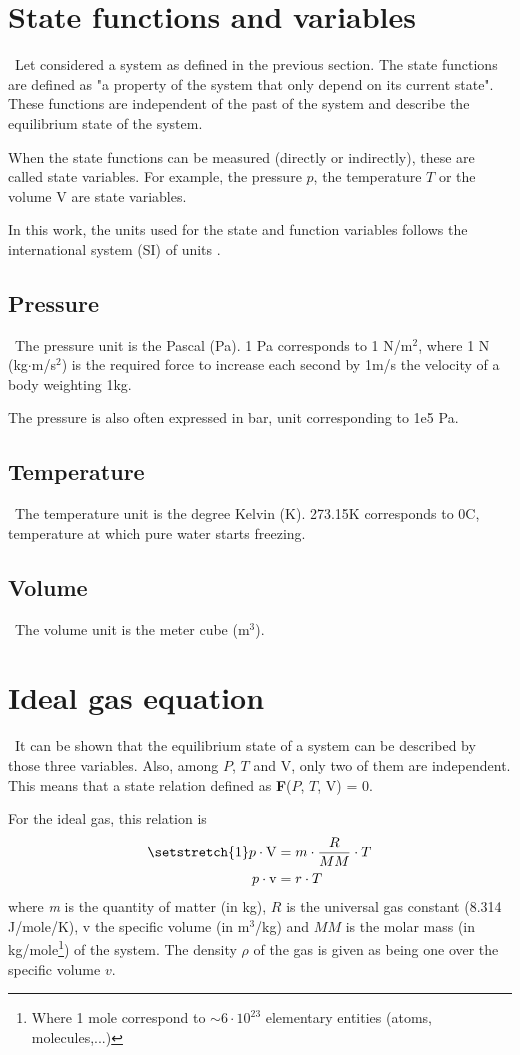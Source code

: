 \section{State functions and variables}\label{sect:C2_State}
\quad\, Let considered a system as defined in the previous section. The state functions are defined as "a property of the system that only depend on its current state". These functions are independent of the past of the system and describe the equilibrium state of the system.

When the state functions can be measured (directly or indirectly), these are called state variables. For example, the pressure $p$, the temperature $T$ or the volume $\mathrm{V}$ are state variables.


In this work, the units used for the state and function variables follows the international system (SI) of units \cite{Nist}. 
\subsection{Pressure}
\quad\, The pressure unit is the Pascal (Pa). 1 Pa corresponds to 1 N/m$^2$, where 1 N (kg$\cdot$m/s$^2$) is the required force to increase each second by 1m/s the velocity of a body weighting 1kg.

The pressure is also often expressed in bar, unit corresponding to 1e5 Pa.

\subsection{Temperature}
\quad\, The temperature unit is the degree Kelvin (K). 273.15\degree K corresponds to 0\degree C, temperature at which pure water starts freezing.

\subsection{Volume}
\quad\, The volume unit is the meter cube (m$^3$).

\section{Ideal gas equation}
\quad\, It can be shown that the equilibrium state of a system can be described by those three variables. Also, among $P$, $T$ and $\mathrm{V}$, only two of them are independent. This means that a state relation defined as \textbf{F}($P$, $T$, $\mathrm{V}$) = 0.

For the ideal gas, this relation is
\begin{align}
\setstretch{1}
p\cdot \mathrm{V} &= m\cdot\frac{R}{MM}\cdot T\nonumber\\
p\cdot \mathrm{v} &= r\cdot T\label{eq:C2_GP}    
\end{align}
where \textit{m} is the quantity of matter (in kg), $R$ is the universal gas constant (8.314 J/mole/K), $\mathrm{v}$ the specific volume (in m$^3$/kg) and $MM$ is the molar mass (in kg/mole\footnote{Where 1 mole correspond to $\sim 6\cdot 10^{23}$ elementary entities (atoms, molecules,...)}) of the system. The density $\rho$ of the gas is given as being one over the specific volume $v$.

